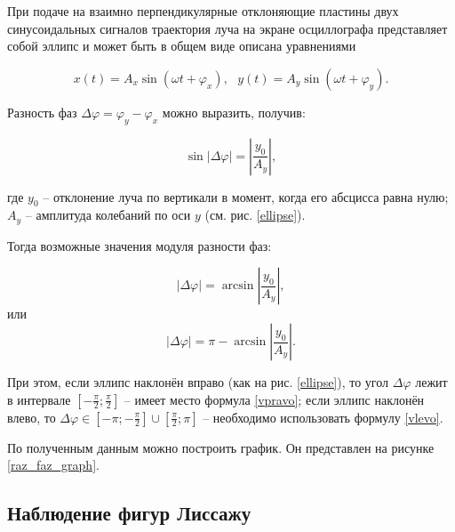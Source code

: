 \documentclass[a4paper,12pt]{article} %
\begin{document}
При подаче на взаимно перпендикулярные отклоняющие пластины двух
синусоидальных сигналов траектория луча на экране осциллографа
представляет собой эллипс и может быть в общем виде описана
уравнениями

\begin{equation}
x\left(t\right) = A_x \sin\left(\omega t + \varphi_x\right),\text{ }y\left(t\right) = A_y \sin\left(\omega t + \varphi_y\right).
\end{equation}

Разность фаз $ \Delta \varphi = \varphi_y - \varphi_x $ можно выразить, получив:

\begin{equation}
\sin \left|\Delta \varphi\right| = \left|\frac{y_0}{A_y}\right|,
\end{equation}

где $ y_0 $ -- отклонение луча по вертикали в момент, когда его абсцисса
равна нулю; $ A_y $ -- амплитуда колебаний по оси $ y $ (см. рис. \ref{ellipse}).

Тогда
возможные значения модуля разности фаз:

\begin{equation}
\left|\Delta \varphi\right|=\arcsin\left|\frac{y_0}{A_y}\right|, \label{vpravo}
\end{equation}
или
\begin{equation}
\left|\Delta \varphi\right|=\pi - \arcsin\left|\frac{y_0}{A_y}\right|. \label{vlevo}
\end{equation}

При этом, если эллипс наклонён вправо (как на рис. \ref{ellipse}), то угол $ \Delta \varphi $ лежит в
интервале $ \left[-\frac{\pi}{2};\frac{\pi}{2}\right] $ -- имеет место формула \eqref{vpravo}; если эллипс наклонён влево, то $ \Delta \varphi \in \left[-\pi;-\frac{\pi}{2}\right]\cup\left[\frac{\pi}{2};\pi \right] $ -- необходимо использовать формулу \eqref{vlevo}.

По полученным данным можно построить график. Он представлен на рисунке \ref{raz_faz_graph}.


\subsection{Наблюдение фигур Лиссажу}
\end{document}
